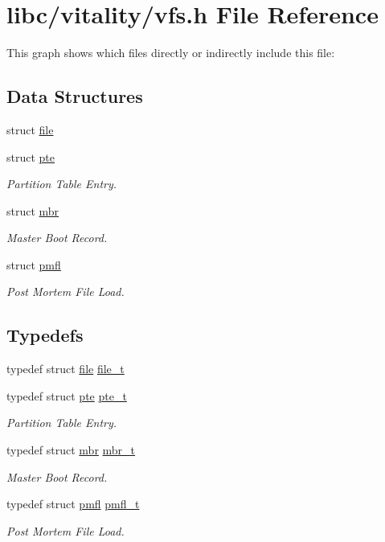 \hypertarget{a00191}{}\section{libc/vitality/vfs.h File Reference}
\label{a00191}
This graph shows which files directly or indirectly include this file\+:
\subsection*{Data Structures}
\begin{DoxyCompactItemize}
\item 
struct \hyperlink{a00308}{file}
\item 
struct \hyperlink{a00312}{pte}
\begin{DoxyCompactList}\small\item\em Partition Table Entry. \end{DoxyCompactList}\item 
struct \hyperlink{a00316}{mbr}
\begin{DoxyCompactList}\small\item\em Master Boot Record. \end{DoxyCompactList}\item 
struct \hyperlink{a00320}{pmfl}
\begin{DoxyCompactList}\small\item\em Post Mortem File Load. \end{DoxyCompactList}\end{DoxyCompactItemize}
\subsection*{Typedefs}
\begin{DoxyCompactItemize}
\item 
typedef struct \hyperlink{a00308}{file} \hyperlink{a00191_aa5445a6474a23ee3e7756d432dfa4ba1_aa5445a6474a23ee3e7756d432dfa4ba1}{file\+\_\+t}
\item 
typedef struct \hyperlink{a00312}{pte} \hyperlink{a00191_aeef6bb6b6bbfd4d912338e1e5c6938a5_aeef6bb6b6bbfd4d912338e1e5c6938a5}{pte\+\_\+t}
\begin{DoxyCompactList}\small\item\em Partition Table Entry. \end{DoxyCompactList}\item 
typedef struct \hyperlink{a00316}{mbr} \hyperlink{a00191_adb8ab3f846ea25ce3271bfabb17fc767_adb8ab3f846ea25ce3271bfabb17fc767}{mbr\+\_\+t}
\begin{DoxyCompactList}\small\item\em Master Boot Record. \end{DoxyCompactList}\item 
typedef struct \hyperlink{a00320}{pmfl} \hyperlink{a00191_a02f7eedc7de6c770b6b29a62905fc61d_a02f7eedc7de6c770b6b29a62905fc61d}{pmfl\+\_\+t}
\begin{DoxyCompactList}\small\item\em Post Mortem File Load. \end{DoxyCompactList}\end{DoxyCompactItemize}


